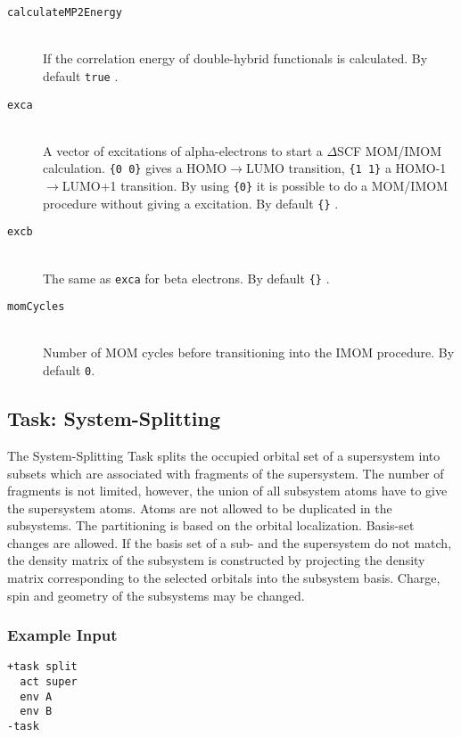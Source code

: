 \documentclass[bibliography=totocnumbered,a4paper,10pt,oneside]{scrbook}
\newcommand{\ttt}[1]{%
  \begingroup\setlength{\fboxsep}{1pt}%
  \colorbox{serenity-green!30}{\texttt{\hspace*{2pt}\vphantom{(g}#1\hspace*{2pt}}}%
  \endgroup
}
\begin{document}
\begin{description}
  \item[\texttt{calculateMP2Energy}]\hfill \\
  If the correlation energy of double-hybrid functionals is calculated. By default \ttt{true}.
  \item[\texttt{exca}]\hfill \\
  A vector of excitations of alpha-electrons to start a $\Delta$SCF MOM/IMOM~\cite{Gilbert2008,Barca2018} calculation. \ttt{\{0 0\}} gives a HOMO$\rightarrow$LUMO transition, \ttt{\{1 1\}} a HOMO-1$\rightarrow$LUMO+1 transition. By using \ttt{\{0\}} it is possible to do a MOM/IMOM procedure without giving a excitation. By default \ttt{\{\}}.
  \item[\texttt{excb}]\hfill \\
  The same as \texttt{exca} for beta electrons. By default \ttt{\{\}}.
  \item[\texttt{momCycles}]\hfill \\
  Number of MOM cycles before transitioning into the IMOM procedure. By default \texttt{0}.
\end{description}

\subsection{Task: System-Splitting}
The System-Splitting Task splits the occupied orbital set of a supersystem into subsets which are associated with fragments of the supersystem. The number of fragments is not limited, however, the union of all subsystem atoms have to give the supersystem atoms. Atoms are not allowed to be duplicated in the subsystems. The partitioning is based on the orbital localization. Basis-set changes are allowed. If the basis set of a sub- and the supersystem do not match, the density matrix of the subsystem is constructed by projecting the density matrix corresponding to the selected orbitals into the subsystem basis. Charge, spin and geometry of
the subsystems may be changed.
\subsubsection{Example Input}
\begin{lstlisting}
+task split
  act super
  env A
  env B
-task
\end{lstlisting}
\end{document}
